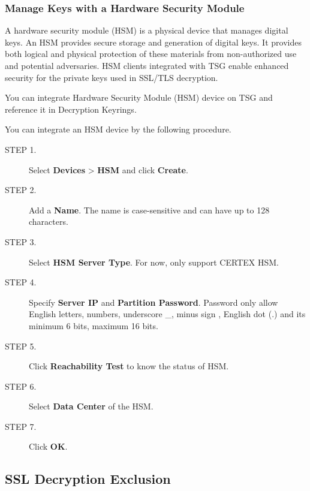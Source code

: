 \subsubsection*{\hypertarget{link:Manage Keys with a Hardware Security Module}{Manage Keys with a Hardware Security Module}}
\label{sec:decrypt:certificate:keyring:hsm}

A hardware security module (HSM) is a physical device that manages digital keys. An HSM provides secure storage and generation of digital keys. It provides both logical and physical protection of these materials from non-authorized use and potential adversaries. HSM clients integrated with TSG enable enhanced security for the private keys used in SSL/TLS decryption.


You can integrate Hardware Security Module (HSM) device on TSG and reference it in Decryption Keyrings.


You can integrate an HSM device by the following procedure. 

\begin{description}
    \item[STEP 1.]	Select \textbf{Devices} > \textbf{HSM} and click \textbf{Create}.
    \item[STEP 2.]	Add a \textbf{Name}. The name is case-sensitive and can have up to 128 characters.
    \item[STEP 3.]	Select \textbf{HSM Server Type}. For now, only support CERTEX HSM.
    \item[STEP 4.]	Specify \textbf{Server IP} and \textbf{Partition Password}. Password only allow English letters, numbers, underscore \_, minus sign \-, English dot (.) and its minimum 6 bits, maximum 16 bits.
    \item[STEP 5.]	Click \textbf{Reachability Test} to know the status of HSM.
    \item[STEP 6.]	Select \textbf{Data Center} of the HSM.
    \item[STEP 7.]	Click \textbf{OK}.
\end{description}

\subsection*{\hypertarget{link:SSL Decryption Exclusion}{SSL Decryption Exclusion}}
\label{sec:decrypt:certificate:exclusion}

